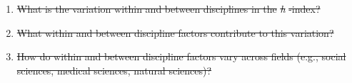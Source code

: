 \documentclass[
  10pt,
  letterpaper,
]{article}
\providecommand{\tightlist}{%
  \setlength{\itemsep}{0pt}\setlength{\parskip}{0pt}}\usepackage{longtable,booktabs,array}
\providecommand{\DIFdeltex}[1]{{\protect\color{red}\sout{#1}}}                      %
\providecommand{\DIFdelbegin}{} %
\providecommand{\DIFdel}[1]{\texorpdfstring{\DIFdeltex{#1}}{}} %
\newcommand{\DIFscaledelfig}{0.5}
\newlength{\DIFdelgraphicswidth} %
\newlength{\DIFdelgraphicsheight} %
\newcommand{\DIFdelincludegraphics}[2][]{%
\sbox{\DIFdelgraphicsbox}{\DIFOincludegraphics[#1]{#2}}%
\settoboxwidth{\DIFdelgraphicswidth}{\DIFdelgraphicsbox} %
\settoboxtotalheight{\DIFdelgraphicsheight}{\DIFdelgraphicsbox} %
\scalebox{\DIFscaledelfig}{%
\parbox[b]{\DIFdelgraphicswidth}{\usebox{\DIFdelgraphicsbox}\\[-\baselineskip] \rule{\DIFdelgraphicswidth}{0em}}\llap{\resizebox{\DIFdelgraphicswidth}{\DIFdelgraphicsheight}{%
\setlength{\unitlength}{\DIFdelgraphicswidth}%
\begin{picture}(1,1)%
\thicklines\linethickness{2pt} %
{\color[rgb]{1,0,0}\put(0,0){\framebox(1,1){}}}%
{\color[rgb]{1,0,0}\put(0,0){\line( 1,1){1}}}%
{\color[rgb]{1,0,0}\put(0,1){\line(1,-1){1}}}%
\end{picture}%
}\hspace*{3pt}}} %
} %
\DeclareRobustCommand{\DIFdelbegin}{\DIFOdelbegin \let\includegraphics\DIFdelincludegraphics} %
\begin{document}
\DIFdelbegin %
\begin{enumerate}%
\item%
\DIFdel{What is the variation within and between disciplines in the
  }\emph{\DIFdel{h}}%
\DIFdel{-index?
}%
\item%
\DIFdel{What within and between discipline factors contribute to this
  variation?
}%
\item%
\DIFdel{How do within and between discipline factors vary across fields (e.g.,
  social sciences, medical sciences, natural sciences)?
}
\end{enumerate}%
\end{document}
